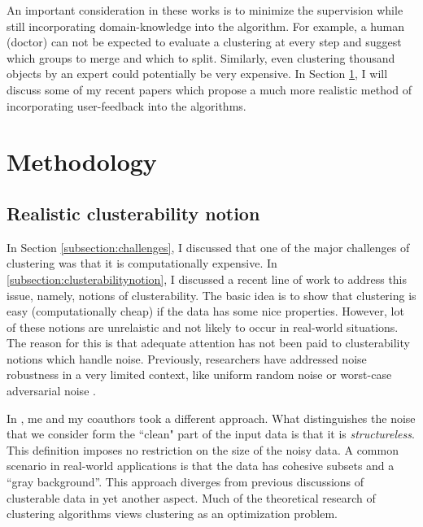 \documentclass[11pt]{article}
\begin{document}
\vspace{0.1in}\noindent An important consideration in these works is to minimize the supervision while still incorporating domain-knowledge into the algorithm. For example, a human (doctor) can not be expected to evaluate a clustering at every step and suggest which groups to merge and which to split. Similarly, even clustering thousand objects by an expert could potentially be very expensive. In Section \ref{section:methodology}, I will discuss some of my recent papers which propose a much more realistic method of incorporating user-feedback into the algorithms.


\section{Methodology}
\label{section:methodology}
\subsection{Realistic clusterability notion}
In Section \ref{subsection:challenges}, I discussed that one of the major challenges of clustering was that it is computationally expensive. In \ref{subsection:clusterabilitynotion}, I discussed a recent line of work to address this issue, namely, notions of clusterability. The basic idea is to show that clustering is easy (computationally cheap) if the data has some nice properties. However, lot of these notions are unrelaistic and not likely to occur in real-world situations. The reason for this is that adequate attention has not been paid to clusterability notions which handle noise. Previously, researchers have addressed noise robustness in a very limited context, like uniform random noise or worst-case adversarial noise \cite{balcan2012clustering,ackerman2009clusterability}.

In \cite{kushagra2016finding}, me and my coauthors took a different approach. What distinguishes the noise that we consider form the ``clean" part of the input data is that it is \emph{structureless}. This definition imposes no restriction on the size of the noisy data. A common scenario in real-world applications is that the data has cohesive subsets and a ``gray background''.  This approach diverges from previous discussions of clusterable data in yet another aspect. Much of the theoretical research of clustering algorithms views clustering as an optimization problem. 
\end{document}
